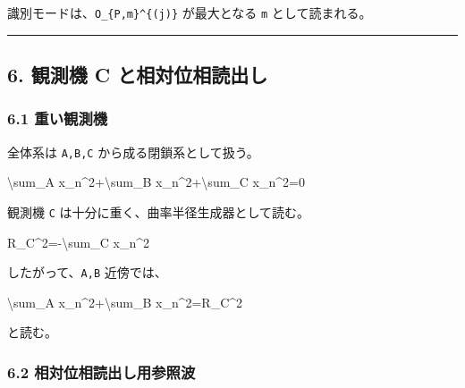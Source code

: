 \documentclass[
  a4paper,
]{article}
\newenvironment{Shaded}{}{}
\newcommand{\NormalTok}[1]{#1}
\begin{document}
識別モードは、\texttt{\textbar{}O\_\{P,m\}\^{}\{(j)\}\textbar{}}
が最大となる \texttt{m} として読まれる。

\begin{center}\rule{0.5\linewidth}{0.5pt}\end{center}

\subsection{6. 観測機 C
と相対位相読出し}\label{ux89b3ux6e2cux6a5f-c-ux3068ux76f8ux5bfeux4f4dux76f8ux8aadux51faux3057}

\subsubsection{6.1 重い観測機}\label{ux91cdux3044ux89b3ux6e2cux6a5f}

全体系は \texttt{A,B,C} から成る閉鎖系として扱う。

\begin{Shaded}
\begin{Highlighting}[]
\NormalTok{\textbackslash{}sum\_A x\_n\^{}2+\textbackslash{}sum\_B x\_n\^{}2+\textbackslash{}sum\_C x\_n\^{}2=0}
\end{Highlighting}
\end{Shaded}

観測機 \texttt{C} は十分に重く、曲率半径生成器として読む。

\begin{Shaded}
\begin{Highlighting}[]
\NormalTok{R\_C\^{}2={-}\textbackslash{}sum\_C x\_n\^{}2}
\end{Highlighting}
\end{Shaded}

したがって、\texttt{A,B} 近傍では、

\begin{Shaded}
\begin{Highlighting}[]
\NormalTok{\textbackslash{}sum\_A x\_n\^{}2+\textbackslash{}sum\_B x\_n\^{}2=R\_C\^{}2}
\end{Highlighting}
\end{Shaded}

と読む。

\subsubsection{6.2
相対位相読出し用参照波}\label{ux76f8ux5bfeux4f4dux76f8ux8aadux51faux3057ux7528ux53c2ux7167ux6ce2}
\end{document}
